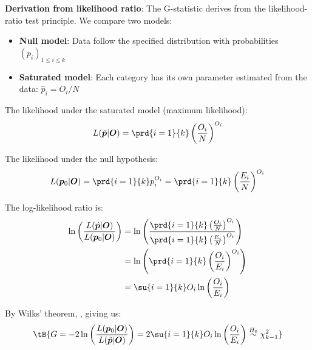 \textbf{Derivation from likelihood ratio}:
The G-statistic derives from the likelihood-ratio test principle. We compare two models:
\begin{itemize}
    \item \textbf{Null model}: Data follow the specified distribution with probabilities $\left(p_i\right)_{1\leq i\leq k}$
    \item \textbf{Saturated model}: Each category has its own parameter estimated from the data: $\hat{p}_i = O_i/N$
\end{itemize}

The likelihood under the saturated model (maximum likelihood):
$$L(\hat{\bm{p}}|\bm{O}) = \prd{i=1}{k}\left(\dfrac{O_{i}}{N}\right)^{O_{i}}$$

The likelihood under the null hypothesis:
$$L(\bm{p}_0|\bm{O}) = \prd{i=1}{k}p_i^{O_{i}} = \prd{i=1}{k}\left(\dfrac{E_{i}}{N}\right)^{O_{i}}$$

The log-likelihood ratio is:
\begin{align*}
\ln\left(\dfrac{L(\hat{\bm{p}}|\bm{O})}{L(\bm{p}_0|\bm{O})}\right)
&= \ln\left(\dfrac{\prd{i=1}{k}\left(\frac{O_{i}}{N}\right)^{O_{i}}}{\prd{i=1}{k}\left(\frac{E_{i}}{N}\right)^{O_{i}}}\right)\\
&= \ln\left(\prd{i=1}{k}\left(\dfrac{O_{i}}{E_{i}}\right)^{O_{i}}\right)\\
&= \su{i=1}{k}O_{i}\ln\left(\dfrac{O_{i}}{E_{i}}\right)
\end{align*}

By Wilks' theorem, , giving us:
$$\tB{G = -2\ln\left(\dfrac{L(\bm{p}_0|\bm{O})}{L(\hat{\bm{p}}|\bm{O})}\right) = 2\su{i=1}{k}O_{i}\ln\left(\dfrac{O_{i}}{E_{i}}\right) \stackrel{H_0}{\sim} \chi^2_{k-1}}$$

